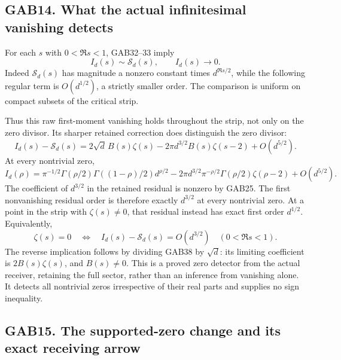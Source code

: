 \documentclass[
  10pt,
  a4paper,
]{article}
\begin{document}
\subsection{GAB14. What the actual infinitesimal vanishing
detects}\label{gab14.-what-the-actual-infinitesimal-vanishing-detects}

For each \(s\) with \(0<\Re s<1\), GAB32--33 imply \[
 I_d(s)\sim\mathcal S_d(s),\qquad I_d(s)\longrightarrow0.
                                                        \tag{GAB37}
\] Indeed \(\mathcal S_d(s)\) has magnitude a nonzero constant times
\(d^{\Re s/2}\), while the following regular term is \(O(d^{1/2})\), a
strictly smaller order. The comparison is uniform on compact subsets of
the critical strip.

Thus this raw first-moment vanishing holds throughout the strip, not
only on the zero divisor. Its sharper retained correction does
distinguish the zero divisor: \[
 I_d(s)-\mathcal S_d(s)
  =2\sqrt d\,B(s)\zeta(s)
       -2\pi d^{3/2}B(s)\zeta(s-2)+O(d^{5/2}).
                                                        \tag{GAB38}
\] At every nontrivial zero, \[
 \boxed{\displaystyle
 I_d(\rho)=
 \pi^{-1/2}\Gamma(\rho/2)\Gamma((1-\rho)/2)d^{\rho/2}
 -2\pi d^{3/2}\pi^{-\rho/2}\Gamma(\rho/2)\zeta(\rho-2)
 +O(d^{5/2}).}                                        \tag{GAB39}
\] The coefficient of \(d^{3/2}\) in the retained residual is nonzero by
GAB25. The first nonvanishing residual order is therefore exactly
\(d^{3/2}\) at every nontrivial zero. At a point in the strip with
\(\zeta(s)\ne0\), that residual instead has exact first order
\(d^{1/2}\). Equivalently, \[
 \zeta(s)=0
 \quad\Longleftrightarrow\quad
 I_d(s)-\mathcal S_d(s)=O(d^{3/2})
       \quad(0<\Re s<1).                              \tag{GAB40}
\] The reverse implication follows by dividing GAB38 by \(\sqrt d\): its
limiting coefficient is \(2B(s)\zeta(s)\), and \(B(s)\ne0\). This is a
proved zero detector from the actual receiver, retaining the full
sector, rather than an inference from vanishing alone. It detects all
nontrivial zeros irrespective of their real parts and supplies no sign
inequality.

\subsection{GAB15. The supported-zero change and its exact receiving
arrow}\label{gab15.-the-supported-zero-change-and-its-exact-receiving-arrow}
\end{document}

